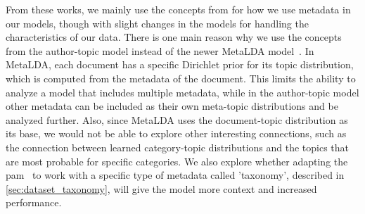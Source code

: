 From these works, we mainly use the concepts from \citet{author_topic_2012} for how we use metadata in our models, though with slight changes in the models for handling the characteristics of our data.
There is one main reason why we use the concepts from the author-topic model instead of the newer MetaLDA model~\cite{MetaLDA2017}.
In MetaLDA, each document has a specific Dirichlet prior for its topic distribution, which is computed from the metadata of the document.
This limits the ability to analyze a model that includes multiple metadata, while in the author-topic model other metadata can be included as their own meta-topic distributions and be analyzed further.
Also, since MetaLDA uses the document-topic distribution as its base, we would not be able to explore other interesting connections, such as the connection between learned category-topic distributions and the topics that are most probable for specific categories.
We also explore whether adapting the \gls{pam}~\cite{li2006pachinko} to work with a specific type of metadata called 'taxonomy', described in \autoref{sec:dataset_taxonomy}, will give the model more context and increased performance.
